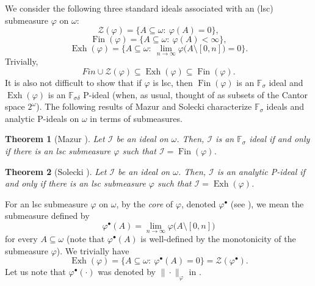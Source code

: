 \documentclass[a4paper,11pt,fleqn]{amsart}
\newtheorem{theorem}{Theorem}[section]
\theoremstyle{definition}
\theoremstyle{remark}
\numberwithin{equation}{section}
\newcommand{\N}{\mathbb{N}}
\newcommand{\F}{\mathbb{F}}
\newcommand{\iI}{\mathcal{I}}
\newcommand{\zZ}{\mathcal{Z}}
\DeclareMathOperator{\exh}{Exh}
\DeclareMathOperator{\fin}{Fin}
\newcommand{\sm}{\setminus}
\newcommand{\sub}{\subseteq}
\newcommand{\seqn}[1]{\big\langle#1\colon\ n\io\big\rangle}
\newcommand{\io}{\in\omega}%
\newcommand{\Cantor}{2^\omega}
\begin{document}
We consider the following three standard ideals associated with an (lsc) submeasure $\varphi$ on $\omega$:
\[\zZ(\varphi)=\big\{A\sub\omega\colon\ \varphi(A)=0\big\},\]
\[\fin(\varphi)=\big\{A\sub\omega\colon\ \varphi(A)<\infty\big\},\]
\[\exh(\varphi)=\big\{A\sub\omega\colon\ \lim_{n\to\infty} \varphi\big(A\sm [0,n]\big)=0\big\}.\]
Trivially,
\[Fin\cup\zZ(\varphi) \sub \exh(\varphi) \sub \fin(\varphi).\]
It is also not difficult to show that if $\varphi$ is lsc, then $\fin(\varphi)$ is an $\F_{\sigma}$ ideal and $\exh(\varphi)$ is an $\F_{\sigma\delta}$ P-ideal (when, as usual, thought of as subsets of the Cantor space $\Cantor$). The following results of Mazur and Solecki characterize $\F_{\sigma}$ ideals and analytic P-ideals on $\omega$ in terms of submeasures.

\begin{theorem}[Mazur \cite{Maz91}]\label{thm:mazur_submeasures}
Let $\iI$ be an ideal on $\omega$. Then, $\iI$ is an $\F_{\sigma}$ ideal if and only if there is an lsc submeasure $\varphi$ such that $\iI=\fin(\varphi)$.
\end{theorem}

\begin{theorem}[Solecki \cite{Sol99}]\label{thm:solecki_submeasures}
Let $\iI$ be an ideal on $\omega$. Then, $\iI$ is an analytic P-ideal if and only if there is an lsc submeasure $\varphi$ such that $\iI=\exh(\varphi)$.
\end{theorem}

%
%

For an lsc submeasure $\varphi$ on $\omega$, by the \textit{core} of $\varphi$, denoted $\varphi^\bullet$ (see \cite[Section 1]{DL08ii}), we mean the submeasure defined by
\[\varphi^\bullet(A)=\lim_{n\to\infty} \varphi\big(A\setminus [0,n]\big)\]
for every $A\sub\omega$ (note that $\varphi^\bullet(A)$ is well-defined by the monotonicity of the submeasure $\varphi$). We trivially have
\[\exh(\varphi)=\big\{A\sub\omega\colon\ \varphi^\bullet(A)=0\big\}=\zZ(\varphi^\bullet).\]
Let us note that $\varphi^\bullet(\cdot)$ was denoted by $\|\cdot\|_{\varphi}$ in \cite{FMRS07}.
\end{document}
